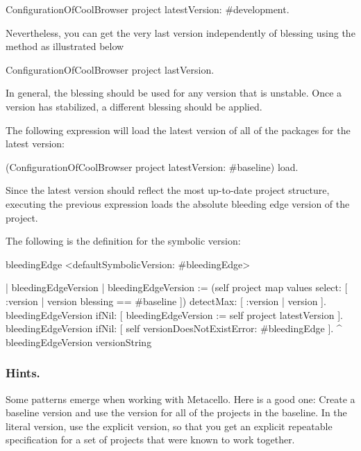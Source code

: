 \documentclass[a4paper,10pt,twoside]{book}
\begin{document}
\begin{code}{}
ConfigurationOfCoolBrowser project latestVersion: #development.
\end{code}

Nevertheless, you can get the very last version independently of blessing using the  method as illustrated below

\begin{code}{}
ConfigurationOfCoolBrowser project lastVersion.
\end{code}

In general, the  blessing should be used for any version that is unstable. Once a version has stabilized, a different blessing should be applied.

The following expression will load the latest version of all of the packages for the latest  version:
 \begin{code}{}
(ConfigurationOfCoolBrowser project latestVersion: #baseline) load.
\end{code}

Since the latest  version should reflect the most up-to-date project structure, executing the previous expression loads the absolute bleeding edge version of the project. 



The following is the definition for the  symbolic version: 

\begin{code}{}
bleedingEdge
       <defaultSymbolicVersion: #bleedingEdge>

       | bleedingEdgeVersion |
       bleedingEdgeVersion := (self project map values select: [ :version |
version blessing == #baseline ])
              detectMax: [ :version | version ].
       bleedingEdgeVersion ifNil: [ bleedingEdgeVersion := self project
latestVersion ].
       bleedingEdgeVersion
              ifNil: [ self versionDoesNotExistError: #bleedingEdge ].
       ^ bleedingEdgeVersion versionString
\end{code}


\subsubsection{Hints.}
Some patterns emerge when working with Metacello. Here is a good one: 
Create a baseline version and use the  version for all of the projects in the baseline. In the literal version, use the explicit version, so that you get an explicit repeatable specification for a set of projects that were known to work together.
\end{document}
